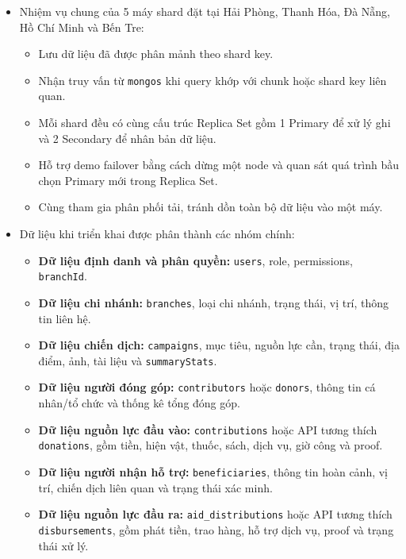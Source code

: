 \documentclass[12pt,a4paper]{article}
\begin{document}
\begin{itemize}
\begin{itemize}
\item Chạy \texttt{mongos} làm entry point cho truy vấn MongoDB.
\item Chạy công cụ QA/demo để kiểm tra luồng nghiệp vụ, thống kê, health, failover và backup/restore từ phía người dùng cuối.
\item Không lưu dữ liệu nghiệp vụ chính như một shard độc lập.
\end{itemize}
\item Nhiệm vụ chung của 5 máy shard đặt tại Hải Phòng, Thanh Hóa, Đà Nẵng, Hồ Chí Minh và Bến Tre:
\begin{itemize}
\item Lưu dữ liệu đã được phân mảnh theo shard key.
\item Nhận truy vấn từ \texttt{mongos} khi query khớp với chunk hoặc shard key liên quan.
\item Mỗi shard đều có cùng cấu trúc Replica Set gồm 1 Primary để xử lý ghi và 2 Secondary để nhân bản dữ liệu.
\item Hỗ trợ demo failover bằng cách dừng một node và quan sát quá trình bầu chọn Primary mới trong Replica Set.
\item Cùng tham gia phân phối tải, tránh dồn toàn bộ dữ liệu vào một máy.
\end{itemize}
\item Dữ liệu khi triển khai được phân thành các nhóm chính:
\begin{itemize}
\item \textbf{Dữ liệu định danh và phân quyền:} \texttt{users}, role, permissions, \texttt{branchId}.
\item \textbf{Dữ liệu chi nhánh:} \texttt{branches}, loại chi nhánh, trạng thái, vị trí, thông tin liên hệ.
\item \textbf{Dữ liệu chiến dịch:} \texttt{campaigns}, mục tiêu, nguồn lực cần, trạng thái, địa điểm, ảnh, tài liệu và \texttt{summaryStats}.
\item \textbf{Dữ liệu người đóng góp:} \texttt{contributors} hoặc \texttt{donors}, thông tin cá nhân/tổ chức và thống kê tổng đóng góp.
\item \textbf{Dữ liệu nguồn lực đầu vào:} \texttt{contributions} hoặc API tương thích \texttt{donations}, gồm tiền, hiện vật, thuốc, sách, dịch vụ, giờ công và proof.
\item \textbf{Dữ liệu người nhận hỗ trợ:} \texttt{beneficiaries}, thông tin hoàn cảnh, vị trí, chiến dịch liên quan và trạng thái xác minh.
\item \textbf{Dữ liệu nguồn lực đầu ra:} \texttt{aid\_distributions} hoặc API tương thích \texttt{disbursements}, gồm phát tiền, trao hàng, hỗ trợ dịch vụ, proof và trạng thái xử lý.

\end{itemize}
\end{itemize}
\end{document}
